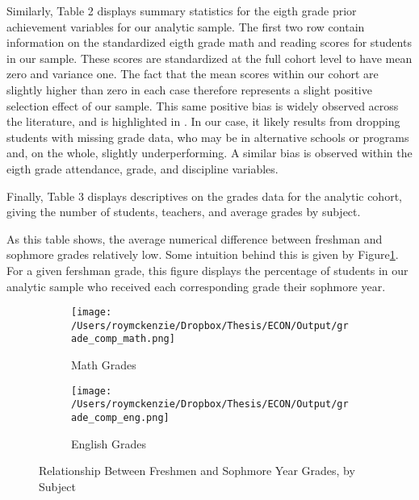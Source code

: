\documentclass[../thesis_main.tex]{subfiles}
\begin{document}



Similarly, Table 2 displays summary statistics for the eigth grade prior achievement variables for our analytic sample. The first two row contain information on the standardized eigth grade math and reading scores for students in our sample. These scores are standardized at the full cohort level to have mean zero and variance one. The fact that the mean scores within our cohort are slightly higher than zero in each case therefore represents a slight positive selection effect of our sample. This same positive bias is widely observed across the literature, and is highlighted in \cite{gilraineMakingTeachingLast2020}. In our case, it likely results from dropping students with missing grade data, who may be in alternative schools or programs and, on the whole, slightly underperforming. A similar bias is observed within the eigth grade attendance, grade, and discipline variables.




Finally, Table 3 displays descriptives on the grades data for the analytic cohort, giving the number of students, teachers, and average grades by subject. %

As this table shows, the average numerical difference between freshman and sophmore grades relatively low. Some intuition behind this is given by Figure\ref{fig:grade_comp}. For a given fershman grade, this figure displays the percentage of students in our analytic sample who received each corresponding grade their sophmore year. 


\begin{figure}
	\centering
	\begin{subfigure}[b]{0.49\textwidth}
		\centering
		\texttt{[image: /Users/roymckenzie/Dropbox/Thesis/ECON/Output/grade\_comp\_math.png]}
		\caption{Math Grades}
	\end{subfigure}
	\hfill
	\begin{subfigure}[b]{0.49\textwidth}
		\centering
		\texttt{[image: /Users/roymckenzie/Dropbox/Thesis/ECON/Output/grade\_comp\_eng.png]}
		\caption{English Grades}
	\end{subfigure}
	\caption{Relationship Between Freshmen and Sophmore Year Grades, by Subject}
	\label{fig:grade_comp}
\end{figure}
\end{document}
